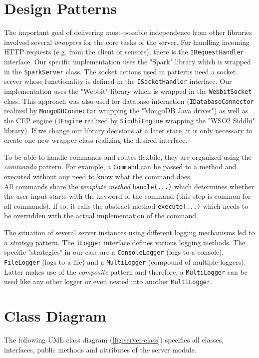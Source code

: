 \section{Design Patterns}
The important goal of delivering most-possible independence from other libraries
involved several \emph{wrappers} for the core tasks of the server.
For handling incoming HTTP requests (e.g. from the client or sensors), there is
the \texttt{IRequestHandler} interface. Our specific implementation uses
the "Spark" library which is wrapped in the \texttt{SparkServer} class.
The socket actions used in patterns need a socket server whose functionality is
defined in the \texttt{ISocketHandler} interface. Our implementation uses the
"Webbit" library which is wrapped in the \texttt{WebbitSocket} class.
This approach was also used for database interaction (\texttt{IDatabaseConnector}
realized by \texttt{MongoDBConnector} wrapping the "MongoDB Java driver") as well as
the CEP engine (\texttt{IEngine} realized by \texttt{SiddhiEngine} wrapping the
"WSO2 Siddhi" library). If we change our library decisions at a later state,
it is only necessary to create one new wrapper class realizing the desired interface.

To be able to handle commands and routes flexbile, they are organized using
the \emph{commando} pattern. For example, a \texttt{Command} can be passed to a
method and executed without any need to know what the command does. \\
All commands share the \emph{template method} \texttt{handle(...)} which
determines whether the user input starts with the keyword of the command
(this step is common for all commands). If so, it calls the abstract method
\texttt{execute(...)} which needs to be overridden with the actual implementation
of the command.

The situation of several server instances using different logging mechanisms
led to a \emph{strategy} pattern. The \texttt{ILogger} interface defines
various logging methods. The specific "strategies" in our case are a
\texttt{ConsoleLogger} (logs to a console), \texttt{FileLogger} (logs to a file)
and a \texttt{MultiLogger} (compound of multiple loggers). Latter makes use
of the \emph{composite} pattern and therefore, a \texttt{MultiLogger} can be used
like any other logger or even nested into another \texttt{MultiLogger}.

\section{Class Diagram}
The following UML class diagram (\autoref{fig:server-class}) specifies all
classes, interfaces, public methods and attributes of the server module.

